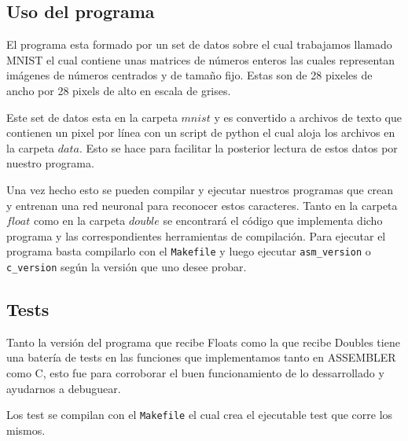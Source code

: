 
\subsection{Uso del programa}

El programa esta formado por un set de datos sobre el cual trabajamos llamado MNIST el cual contiene unas matrices de números enteros las cuales representan imágenes de números centrados y de tamaño fijo. Estas son de 28 pixeles de ancho por 28 pixels de alto en escala de grises.

Este set de datos esta en la carpeta $mnist$ y es convertido a archivos de texto que contienen un pixel por línea con un script de python el cual aloja los archivos en la carpeta $data$. Esto se hace para facilitar la posterior lectura de estos datos por nuestro programa.

Una vez hecho esto se pueden compilar y ejecutar nuestros programas que crean y entrenan una red neuronal para reconocer estos caracteres. Tanto en la carpeta $float$ como en la carpeta $double$ se encontrará el código que implementa dicho programa y las correspondientes herramientas de compilación. Para ejecutar el programa basta compilarlo con el \texttt{Makefile} y luego ejecutar \texttt{asm\_version} o \texttt{c\_version} según la versión que uno desee probar.

\subsection{Tests}

Tanto la versión del programa que recibe Floats como la que recibe Doubles tiene una batería de tests en las funciones que implementamos tanto en ASSEMBLER como C, esto fue para corroborar el buen funcionamiento de lo dessarrollado y ayudarnos a debuguear.

Los test se compilan con el \texttt{Makefile} el cual crea el ejecutable test que corre los mismos.